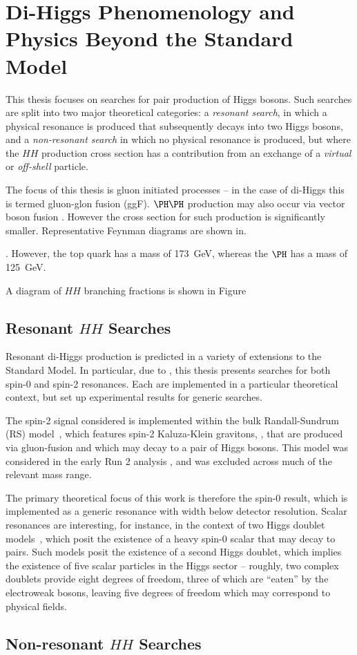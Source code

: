 \chapter{Di-Higgs Phenomenology and Physics Beyond the Standard Model}
This thesis focuses on searches for pair production of Higgs bosons. Such searches are split into two 
major theoretical categories: a \emph{resonant search}, in which a physical resonance is produced that subsequently
decays into two Higgs bosons, and a \emph{non-resonant search} in which no physical resonance is produced, but
where the $HH$ production cross section has a contribution from an exchange of a \emph{virtual} or \emph{off-shell}
particle. 

The focus of this thesis is gluon initiated processes -- in the case of di-Higgs this is termed gluon-glon fusion
(ggF). $\higgs\higgs$ production may also occur via vector boson fusion . However the cross section for such production is significantly smaller. Representative Feynman diagrams are shown in.

. However, the top quark has a mass of \SI{173}{\GeV}, whereas the 
$\higgs$ has a mass of \SI{125}{\GeV}.

A diagram of $HH$ branching fractions is shown in Figure 

\section{Resonant $HH$ Searches}
Resonant di-Higgs production is predicted in a variety of extensions to the
Standard Model. In particular, due to , this thesis presents
searches for both spin-0 and spin-2 resonances. Each are implemented in a particular 
theoretical context, but set up experimental results for generic searches.

The spin-2 signal considered is implemented within the bulk Randall-Sundrum (RS)
model~\cite{Gravitons}, which features spin-2 Kaluza-Klein gravitons,
\PGrav, that are produced via gluon-fusion and which may decay to a pair of Higgs bosons.
This model was considered in the early Run 2 analysis , and was excluded 
across much of the relevant mass range. 

The primary theoretical focus of this work is therefore the spin-0 result, which 
is implemented as a generic resonance with width below detector resolution. Scalar 
resonances are interesting, for instance, in the context of two Higgs doublet models~\cite{2HDM}, which 
posit the existence of a heavy spin-0 scalar \PScal{} that may decay to \higgs pairs.
Such models posit the existence of a second Higgs doublet, which implies the existence of five scalar
particles in the Higgs sector -- roughly, two complex doublets provide eight degrees of freedom, three of 
which are ``eaten'' by the electroweak bosons, leaving five degrees of freedom which may correspond
to physical fields.


\section{Non-resonant $HH$ Searches}

